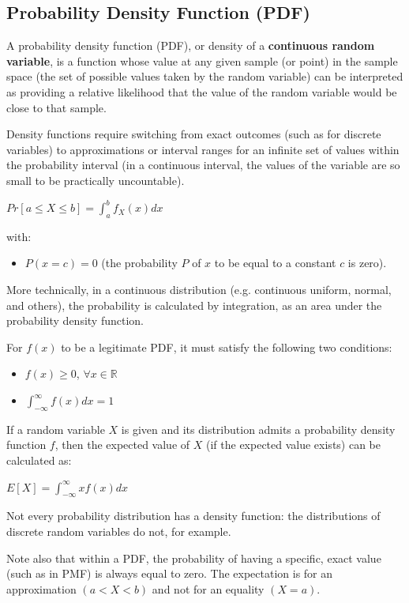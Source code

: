 \documentclass{article}
\begin{document}
\subsection{Probability Density Function (PDF)}

A probability density function (PDF), or density of a \textbf{continuous random variable}, is a function whose value at any given sample (or point) in the sample space (the set of possible values taken by the random variable) can be interpreted as providing a relative likelihood that the value of the random variable would be close to that sample.

Density functions require switching from exact outcomes (such as for discrete variables) to approximations or interval ranges for an infinite set of values within the probability interval (in a continuous interval, the values of the variable are so small to be practically uncountable).

$\displaystyle Pr[a\leq X\leq b]=\int _{a}^{b}f_{X}(x)dx$

with:
\begin{itemize}
    \item $P(x=c)=0$ (the probability $P$ of $x$ to be equal to a constant $c$ is zero).
\end{itemize}

More technically, in a continuous distribution (e.g. continuous uniform, normal, and others), the probability is calculated by integration, as an area under the probability density function.

For $f(x)$ to be a legitimate PDF, it must satisfy the following two conditions:
\begin{itemize}
    \item $f(x) \geq 0$, $\forall x \in \mathbb{R}$
    \item $\displaystyle \int _{-\infty }^{\infty } f(x)dx=1$
\end{itemize}
If a random variable $X$ is given and its distribution admits a probability density function $f$, then the expected value of $X$ (if the expected value exists) can be calculated as:

$\displaystyle {E} [X]=\int _{-\infty }^{\infty }xf(x)dx$

Not every probability distribution has a density function: the distributions of discrete random variables do not, for example.

Note also that within a PDF, the probability of having a specific, exact value (such as in PMF) is always equal to zero. The expectation is for an approximation $(a < X < b)$ and not for an equality $(X = a)$.
\end{document}
